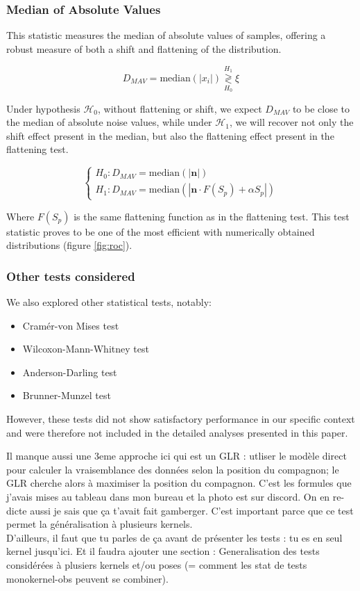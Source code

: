 \documentclass{article}
\newcommand{\dm}[1]{{\color{mulberry} #1}}
\begin{document}
\subsubsection{Median of Absolute Values}

This statistic measures the median of absolute values of samples, offering a robust measure of both a shift and flattening of the distribution.

$$
D_{MAV} = \text{median}(|x_i|) \stackrel{H_1}{\underset{H_0}{\gtrless}} \xi
$$

Under hypothesis $\mathcal{H}_0$, without flattening or shift, we expect $D_{MAV}$ to be close to the median of absolute noise values, while under $\mathcal{H}_1$, we will recover not only the shift effect present in the median, but also the flattening effect present in the flattening test.

$$
\begin{cases}
H_0 : D_{MAV} = \text{median}(|\mathbf{n}|)\\
H_1 : D_{MAV} = \text{median}(|\mathbf{n} \cdot F(S_p) + \alpha S_p|)
\end{cases}
$$

Where $F(S_p)$ is the same flattening function as in the flattening test. This test statistic proves to be one of the most efficient with numerically obtained distributions (figure \ref{fig:roc}).

\subsubsection{Other tests considered}\label{sec:other_tests}
We also explored other statistical tests, notably:
\begin{itemize}
    \item Cramér-von Mises test
    \item Wilcoxon-Mann-Whitney test
    \item Anderson-Darling test
    \item Brunner-Munzel test
\end{itemize}

However, these tests did not show satisfactory performance in our specific context and were therefore not included in the detailed analyses presented in this paper.



\dm{Il manque aussi une 3eme approche  ici qui est un GLR : utliser le modèle direct pour calculer la vraisemblance des données selon la position du compagnon; le GLR cherche alors à maximiser la position du compagnon. C'est les formules que j'avais mises au tableau dans mon bureau et la photo est sur discord. On en re-dicte aussi je sais que ça t'avait fait gamberger. C'est important parce que ce test permet la généralisation à plusieurs kernels. \\
D'ailleurs, il faut que tu parles de ça avant de présenter les tests : tu es en seul kernel jusqu'ici. Et il faudra ajouter  une section : Generalisation des tests considérées à plusiers kernels et/ou poses (= comment les stat de tests monokernel-obs peuvent se combiner).}
\end{document}

